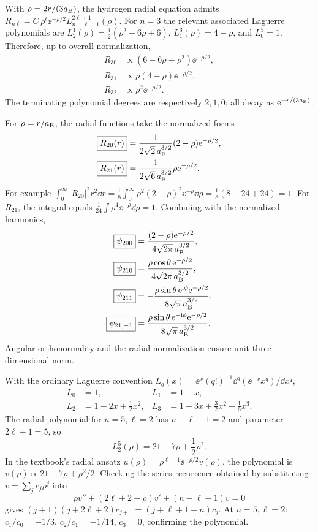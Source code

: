 With $\rho=2r/(3a_{\mathrm B})$,
the hydrogen radial equation admits
$R_{n\ell}=C\,\rho^\ell\ee^{-\rho/2}
L_{n-\ell-1}^{2\ell+1}(\rho)$.
For $n=3$ the relevant associated Laguerre
polynomials are $L_2^1(\rho)=
\frac12(\rho^2-6\rho+6)$,
$L_1^3(\rho)=4-\rho$, and $L_0^5=1$.
Therefore, up to overall normalization,
\begin{align}
\boxed{R_{30}}&\propto
(6-6\rho+\rho^2)\ee^{-\rho/2},\\
\boxed{R_{31}}&\propto
\rho(4-\rho)\ee^{-\rho/2},\\
\boxed{R_{32}}&\propto
\rho^2\ee^{-\rho/2}.
\end{align}
The terminating polynomial degrees are respectively
$2,1,0$; all decay as $\mathrm e^{-r/(3a_{\mathrm B})}$.

For $\rho=r/a_{\mathrm B}$, the radial functions take
the normalized forms
\begin{align}
\boxed{R_{20}(r)}&=\frac{1}{2\sqrt2\,a_{\mathrm B}^{3/2}}
(2-\rho)\mathrm e^{-\rho/2},\\
\boxed{R_{21}(r)}&=\frac1{2\sqrt6\,a_{\mathrm B}^{3/2}}
\rho\mathrm e^{-\rho/2}.
\end{align}
For example
$\int_0^\infty |R_{20}|^2r^2\dd r
=\frac18\int_0^\infty
\rho^2(2-\rho)^2\ee^{-\rho}\dd\rho
=\frac18(8-24+24)=1$.
For $R_{21}$, the integral equals
$\frac1{24}\int\rho^4\ee^{-\rho}\dd\rho=1$.
Combining with the normalized harmonics,
\begin{align}
\boxed{\psi_{200}}&=
\frac{(2-\rho)\mathrm e^{-\rho/2}}{4\sqrt{2\pi}\,a_{\mathrm B}^{3/2}},\\
\boxed{\psi_{210}}&=
\frac{\rho\cos\theta\,\mathrm e^{-\rho/2}}
{4\sqrt{2\pi}\,a_{\mathrm B}^{3/2}},\\
\boxed{\psi_{211}}&=
-\frac{\rho\sin\theta\,\mathrm e^{\mathrm i\phi}\mathrm e^{-\rho/2}}
{8\sqrt{\pi}\,a_{\mathrm B}^{3/2}},\\
\boxed{\psi_{21,-1}}&=
\frac{\rho\sin\theta\,\mathrm e^{-\mathrm i\phi}\mathrm e^{-\rho/2}}
{8\sqrt{\pi}\,a_{\mathrm B}^{3/2}}.
\end{align}
Angular orthonormality and the radial normalization
ensure unit three-dimensional norm.

With the ordinary Laguerre convention
$L_q(x)=\ee^x(q!)^{-1}
\dd^q(\ee^{-x}x^q)/\dd x^q$,
\begin{align}
L_0&=1,&L_1&=1-x,\\
L_2&=1-2x+\tfrac12x^2,&
L_3&=1-3x+\tfrac32x^2-\tfrac16x^3.
\end{align}
The radial polynomial for $n=5,\ell=2$ has
$n-\ell-1=2$ and parameter $2\ell+1=5$,
so
\begin{equation}
\boxed{L_2^5(\rho)=21-7\rho+\frac12\rho^2}.
\end{equation}
In the textbook's radial ansatz $u(\rho)=
\rho^{\ell+1}\ee^{-\rho/2}v(\rho)$,
the polynomial is
$\boxed{v(\rho)\propto21-7\rho+\rho^2/2}$.
Checking the series recurrence obtained by
substituting $v=\sum_jc_j\rho^j$ into
\begin{equation}
\rho v''+(2\ell+2-\rho)v'
+(n-\ell-1)v=0
\end{equation}
gives $(j+1)(j+2\ell+2)c_{j+1}=
(j+\ell+1-n)c_j$.
At $n=5,\ell=2$:
$c_1/c_0=-1/3$, $c_2/c_1=-1/14$,
$c_3=0$, confirming the polynomial.

